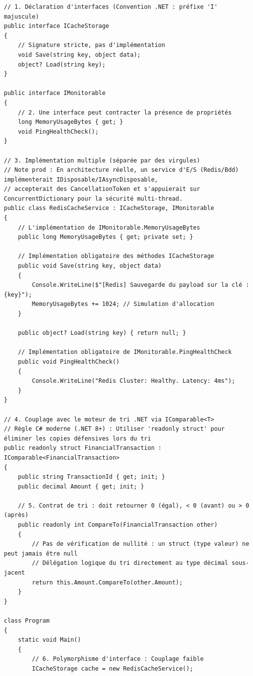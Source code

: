 \begin{lstlisting}[caption={Implémentation multiple et interfaces de tri natives}]
// 1. Déclaration d'interfaces (Convention .NET : préfixe 'I' majuscule)
public interface ICacheStorage
{
    // Signature stricte, pas d'implémentation
    void Save(string key, object data);
    object? Load(string key);
}

public interface IMonitorable
{
    // 2. Une interface peut contracter la présence de propriétés
    long MemoryUsageBytes { get; }
    void PingHealthCheck();
}

// 3. Implémentation multiple (séparée par des virgules)
// Note prod : En architecture réelle, un service d'E/S (Redis/Bdd) implémenterait IDisposable/IAsyncDisposable,
// accepterait des CancellationToken et s'appuierait sur ConcurrentDictionary pour la sécurité multi-thread.
public class RedisCacheService : ICacheStorage, IMonitorable
{
    // L'implémentation de IMonitorable.MemoryUsageBytes
    public long MemoryUsageBytes { get; private set; }

    // Implémentation obligatoire des méthodes ICacheStorage
    public void Save(string key, object data)
    {
        Console.WriteLine($"[Redis] Sauvegarde du payload sur la clé : {key}");
        MemoryUsageBytes += 1024; // Simulation d'allocation
    }

    public object? Load(string key) { return null; }

    // Implémentation obligatoire de IMonitorable.PingHealthCheck
    public void PingHealthCheck()
    {
        Console.WriteLine("Redis Cluster: Healthy. Latency: 4ms");
    }
}

// 4. Couplage avec le moteur de tri .NET via IComparable<T>
// Règle C# moderne (.NET 8+) : Utiliser 'readonly struct' pour éliminer les copies défensives lors du tri
public readonly struct FinancialTransaction : IComparable<FinancialTransaction>
{
    public string TransactionId { get; init; }
    public decimal Amount { get; init; }

    // 5. Contrat de tri : doit retourner 0 (égal), < 0 (avant) ou > 0 (après)
    public readonly int CompareTo(FinancialTransaction other)
    {
        // Pas de vérification de nullité : un struct (type valeur) ne peut jamais être null
        // Délégation logique du tri directement au type décimal sous-jacent
        return this.Amount.CompareTo(other.Amount);
    }
}

class Program
{
    static void Main()
    {
        // 6. Polymorphisme d'interface : Couplage faible
        ICacheStorage cache = new RedisCacheService();
        

\end{lstlisting}
